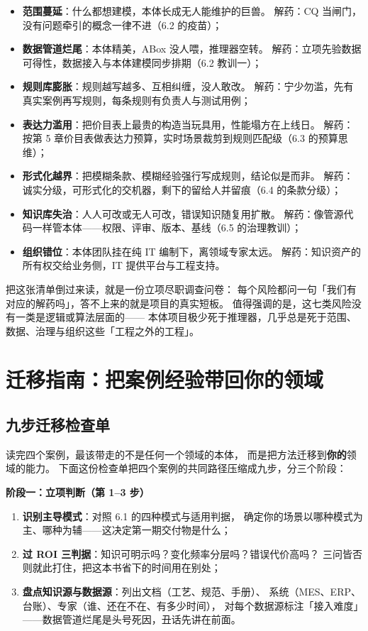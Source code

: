 \begin{itemize}
\item \textbf{范围蔓延}：什么都想建模，本体长成无人能维护的巨兽。
  解药：CQ 当闸门，没有问题牵引的概念一律不进（6.2 的疫苗）；
\item \textbf{数据管道烂尾}：本体精美，ABox 没人喂，推理器空转。
  解药：立项先验数据可得性，数据接入与本体建模同步排期（6.2 教训一）；
\item \textbf{规则库膨胀}：规则越写越多、互相纠缠，没人敢改。
  解药：宁少勿滥，先有真实案例再写规则，每条规则有负责人与测试用例；
\item \textbf{表达力滥用}：把价目表上最贵的构造当玩具用，性能塌方在上线日。
  解药：按第 5 章价目表做表达力预算，实时场景裁剪到规则匹配级（6.3 的预算思维）；
\item \textbf{形式化越界}：把模糊条款、模糊经验强行写成规则，结论似是而非。
  解药：诚实分级，可形式化的交机器，剩下的留给人并留痕（6.4 的条款分级）；
\item \textbf{知识库失治}：人人可改或无人可改，错误知识随复用扩散。
  解药：像管源代码一样管本体——权限、评审、版本、基线（6.5 的治理教训）；
\item \textbf{组织错位}：本体团队挂在纯 IT 编制下，离领域专家太远。
  解药：知识资产的所有权交给业务侧，IT 提供平台与工程支持。
\end{itemize}

把这张清单倒过来读，就是一份立项尽职调查问卷：
每个风险都问一句「我们有对应的解药吗」，答不上来的就是项目的真实短板。
值得强调的是，这七类风险没有一类是逻辑或算法层面的——
本体项目极少死于推理器，几乎总是死于范围、数据、治理与组织这些「工程之外的工程」。

\section{迁移指南：把案例经验带回你的领域}

\subsection{九步迁移检查单}

读完四个案例，最该带走的不是任何一个领域的本体，
而是把方法迁移到\textbf{你的}领域的能力。
下面这份检查单把四个案例的共同路径压缩成九步，分三个阶段：

\textbf{阶段一：立项判断（第 1--3 步）}
\begin{enumerate}
\item \textbf{识别主导模式}：对照 6.1 的四种模式与适用判据，
  确定你的场景以哪种模式为主、哪种为辅——这决定第一期交付物是什么；
\item \textbf{过 ROI 三判据}：知识可明示吗？变化频率分层吗？错误代价高吗？
  三问皆否则就此打住，把这本书省下的时间用在别处；
\item \textbf{盘点知识源与数据源}：列出文档（工艺、规范、手册）、
  系统（MES、ERP、台账）、专家（谁、还在不在、有多少时间），
  对每个数据源标注「接入难度」——数据管道烂尾是头号死因，丑话先讲在前面。
\end{enumerate}

